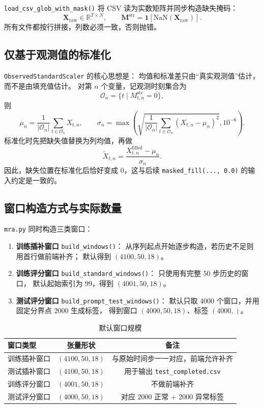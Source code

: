 \documentclass[UTF8,11pt,a4paper]{ctexart}
\begin{document}
\texttt{load\_csv\_glob\_with\_mask()} 将 CSV 读为实数矩阵并同步构造缺失掩码：
\[
\bm{X}_{\mathrm{raw}}\in\mathbb{R}^{T\times N},
\qquad
\bm{M}^{\mathrm{str}}=\mathbf{1}[\mathrm{NaN}(\bm{X}_{\mathrm{raw}})].
\]
所有文件都按行拼接，列数必须一致，否则抛错。

\subsection{仅基于观测值的标准化}

\texttt{ObservedStandardScaler} 的核心思想是：
均值和标准差只由“真实观测值”估计，而不是由填充值估计。
对第 $n$ 个变量，记观测时刻集合为
\[
\mathcal{O}_n=\{t\mid M^{\mathrm{str}}_{t,n}=0\},
\]
则
\[
\mu_n=\frac{1}{|\mathcal{O}_n|}\sum_{t\in\mathcal{O}_n}X_{t,n},
\qquad
\sigma_n=\max\!\left(
\sqrt{\frac{1}{|\mathcal{O}_n|}\sum_{t\in\mathcal{O}_n}(X_{t,n}-\mu_n)^2},
10^{-6}
\right).
\]
标准化时先把缺失值替换为列均值，再做
\[
\tilde{X}_{t,n}=\frac{X^{\mathrm{filled}}_{t,n}-\mu_n}{\sigma_n}.
\]
因此，缺失位置在标准化后恰好变成 0，这与后续
\texttt{masked\_fill(..., 0.0)} 的输入约定是一致的。

\subsection{窗口构造方式与实际数量}

\texttt{mra.py} 同时构造三类窗口：
\begin{enumerate}
  \item \textbf{训练插补窗口}
  \texttt{build\_windows()}：
  从序列起点开始逐步构造，若历史不足则用首行做前端补齐；
  默认得到 $(4100,50,18)$。
  \item \textbf{训练评分窗口}
  \texttt{build\_standard\_windows()}：
  只使用有完整 $50$ 步历史的窗口，
  默认起始索引为 99，得到 $(4001,50,18)$。
  \item \textbf{测试评分窗口}
  \texttt{build\_prompt\_test\_windows()}：
  默认只取 4000 个窗口，并用固定分界点 2000 生成标签，
  得到窗口 $(4000,50,18)$、标签 $(4000,)$。
\end{enumerate}

\begin{table}[H]
\centering
\caption{默认窗口规模}
\begin{tabular}{@{}lcc@{}}
\toprule
窗口类型 & 张量形状 & 备注 \\
\midrule
训练插补窗口 & $(4100,50,18)$ & 与原始时间步一一对应，前端允许补齐 \\
测试插补窗口 & $(4100,50,18)$ & 用于输出 \texttt{test\_completed.csv} \\
训练评分窗口 & $(4001,50,18)$ & 不做前端补齐 \\
测试评分窗口 & $(4000,50,18)$ & 对应 2000 正常 + 2000 异常标签 \\
\bottomrule
\end{tabular}
\end{table}
\end{document}
